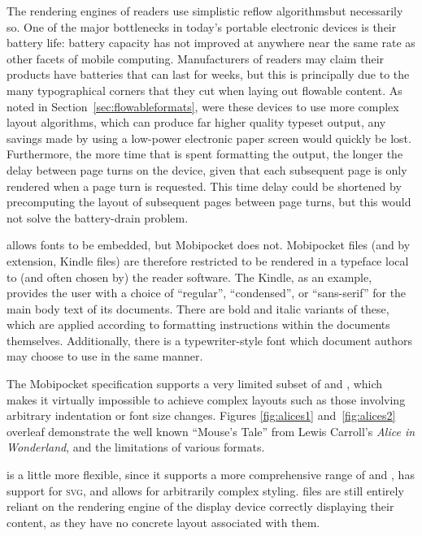 The rendering engines of \ebook{} readers use simplistic reflow algorithms\ed but necessarily so. One of the major bottlenecks in today's portable electronic devices is their battery life: battery capacity has not improved at anywhere near the same rate as other facets of mobile computing. Manufacturers of \ebook{} readers may claim their products have batteries that can last for weeks, but this is principally due to the many typographical corners that they cut when laying out flowable content. As noted in Section~\ref{sec:flowableformats}, were these devices to use more complex layout algorithms, which can produce far higher quality typeset output, any savings made by using a low-power electronic paper screen would quickly be lost. Furthermore, the more time that is spent formatting the output, the longer the delay between page turns on the device, given that each subsequent page is only rendered when a page turn is requested. This time delay could be shortened by precomputing the layout of subsequent pages between page turns, but this would not solve the battery-drain problem.

\epub{} allows fonts to be embedded, but Mobipocket does not. Mobipocket files (and by extension, Kindle files) are therefore restricted to be rendered in a typeface local to (and often chosen by) the reader software. The Kindle, as an example, provides the user with a choice of ``regular'', ``condensed'', or ``sans-serif'' for the main body text of its documents. There are bold and italic variants of these, which are applied according to formatting instructions within the documents themselves. Additionally, there is a typewriter-style font which document authors may choose to use in the same manner.


The Mobipocket specification supports a very limited subset of \html{} and \css{}, which makes it virtually impossible to achieve complex layouts such as those involving arbitrary indentation or font size changes. Figures \ref{fig:alices1} and~\ref{fig:alices2} overleaf demonstrate the well known ``Mouse's Tale'' from Lewis Carroll's \emph{Alice in Wonderland}, and the limitations of various formats.


\epub{} is a little more flexible, since it supports a more comprehensive range of \xhtml{} and \css{}, has support for \textsc{svg}, and allows for arbitrarily complex styling. \epub{} files are still entirely reliant on the rendering engine of the display device correctly displaying their content, as they have no concrete layout associated with them.





